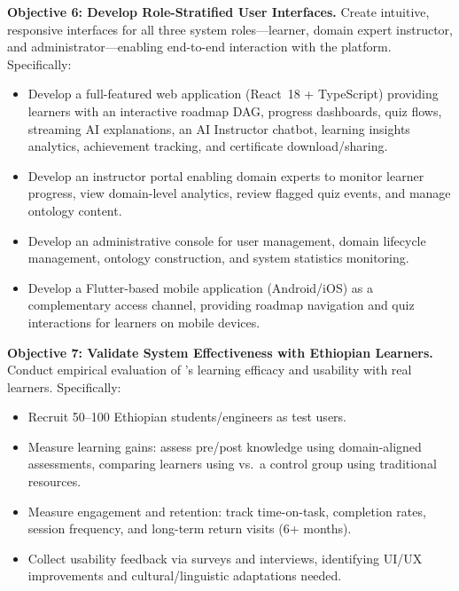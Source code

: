 \textbf{Objective 6: Develop Role-Stratified User Interfaces.} Create intuitive, responsive interfaces for all three system roles---learner, domain expert instructor, and administrator---enabling end-to-end interaction with the platform. Specifically:
\begin{itemize}
    \item Develop a full-featured web application (React~18 + TypeScript) providing learners with an interactive roadmap DAG, progress dashboards, quiz flows, streaming AI explanations, an AI Instructor chatbot, learning insights analytics, achievement tracking, and certificate download/sharing.
    \item Develop an instructor portal enabling domain experts to monitor learner progress, view domain-level analytics, review flagged quiz events, and manage ontology content.
    \item Develop an administrative console for user management, domain lifecycle management, ontology construction, and system statistics monitoring.
    \item Develop a Flutter-based mobile application (Android/iOS) as a complementary access channel, providing roadmap navigation and quiz interactions for learners on mobile devices.
\end{itemize}

\textbf{Objective 7: Validate System Effectiveness with Ethiopian Learners.} Conduct empirical evaluation of \projectname's learning efficacy and usability with real learners. Specifically:
\begin{itemize}
    \item Recruit 50--100 Ethiopian students/engineers as test users.
    \item Measure learning gains: assess pre/post knowledge using domain-aligned assessments, comparing learners using \projectname{} vs.\ a control group using traditional resources.
    \item Measure engagement and retention: track time-on-task, completion rates, session frequency, and long-term return visits (6+ months).
    \item Collect usability feedback via surveys and interviews, identifying UI/UX improvements and cultural/linguistic adaptations needed.
\end{itemize}

